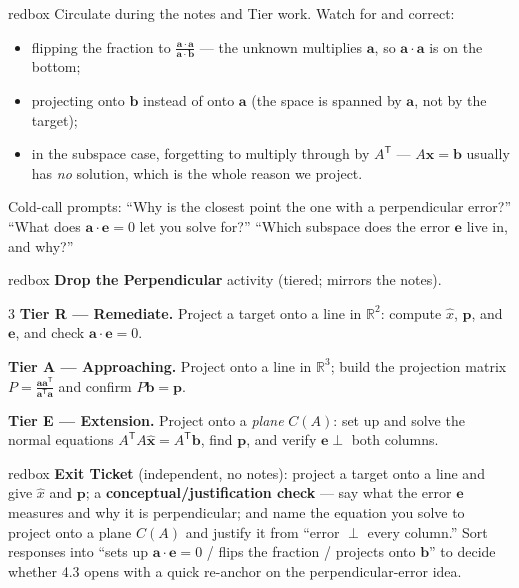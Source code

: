 \documentclass[10pt]{article}
\newcommand{\xx}{\mathbf{x}}
\newcommand{\bb}{\mathbf{b}}
\newcommand{\pp}{\mathbf{p}}
\newcommand{\ee}{\mathbf{e}}
\newcommand{\avec}{\mathbf{a}}
\newcommand{\T}{\mathsf{T}}
\begin{document}
\begin{skillbox}{redbox}
Circulate during the notes and Tier work. Watch for and correct:
\begin{itemize}[leftmargin=1.2em, nosep]
  \item flipping the fraction to $\frac{\avec\cdot\avec}{\avec\cdot\bb}$ --- the unknown multiplies $\avec$, so $\avec\cdot\avec$ is on the bottom;
  \item projecting onto $\bb$ instead of onto $\avec$ (the space is spanned by $\avec$, not by the target);
  \item in the subspace case, forgetting to multiply through by $A^{\T}$ --- $A\hat{\xx}=\bb$ usually has \emph{no} solution, which is the whole reason we project.
\end{itemize}
Cold-call prompts: ``Why is the closest point the one with a perpendicular error?'' ``What does
$\avec\cdot\ee=0$ let you solve for?'' ``Which subspace does the error $\ee$ live in, and why?''
\end{skillbox}

\begin{skillbox}{redbox}
\textbf{Drop the Perpendicular} activity (tiered; mirrors the notes).
\begin{multicols}{3}
\textbf{Tier R --- Remediate.} Project a target onto a line in $\mathbb{R}^2$: compute $\hat{x}$, $\pp$,
and $\ee$, and check $\avec\cdot\ee=0$.

\columnbreak
\textbf{Tier A --- Approaching.} Project onto a line in $\mathbb{R}^3$; build the projection matrix
$P=\frac{\avec\avec^{\T}}{\avec^{\T}\avec}$ and confirm $P\bb=\pp$.

\columnbreak
\textbf{Tier E --- Extension.} Project onto a \emph{plane} $C(A)$: set up and solve the normal equations
$A^{\T}A\hat{\xx}=A^{\T}\bb$, find $\pp$, and verify $\ee\perp$ both columns.
\end{multicols}
\end{skillbox}

\begin{skillbox}{redbox}
\textbf{Exit Ticket} (independent, no notes): project a target onto a line and give $\hat{x}$ and $\pp$;
a \textbf{conceptual/justification check} --- say what the error $\ee$ measures and why it is
perpendicular; and name the equation you solve to project onto a plane $C(A)$ and justify it from
``error $\perp$ every column.'' Sort responses into ``sets up $\avec\cdot\ee=0$ / flips the fraction /
projects onto $\bb$'' to decide whether 4.3 opens with a quick re-anchor on the perpendicular-error idea.
\end{skillbox}
\end{document}
